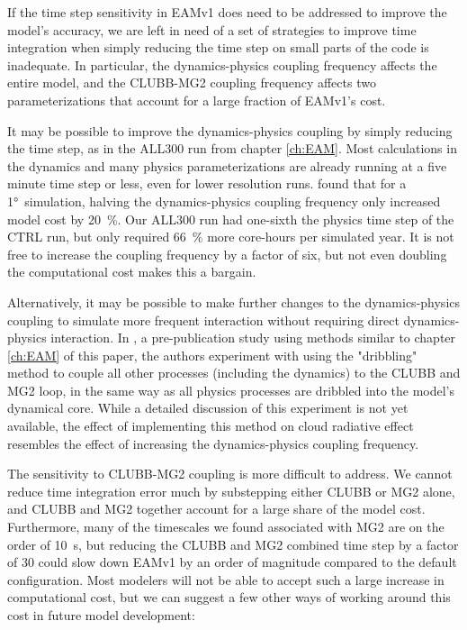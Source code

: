 \documentclass [11pt, proquest] {uwthesis}[2020/02/24]
\begin{document}
If the time step sensitivity in EAMv1 does need to be addressed to improve the model's accuracy, we are left in need of a set of strategies to improve time integration when simply reducing the time step on small parts of the code is inadequate. In particular, the dynamics-physics coupling frequency affects the entire model, and the CLUBB-MG2 coupling frequency affects two parameterizations that account for a large fraction of EAMv1's cost.

It may be possible to improve the dynamics-physics coupling by simply reducing the time step, as in the ALL300 run from chapter \ref{ch:EAM}. Most calculations in the dynamics and many physics parameterizations are already running at a five minute time step or less, even for lower resolution runs. \textcite{Donahue2020} found that for a \ang{1}~simulation, halving the dynamics-physics coupling frequency only increased model cost by \SI{20}{\percent}. Our ALL300 run had one-sixth the physics time step of the CTRL run, but only required \SI{66}{\percent} more core-hours per simulated year. It is not free to increase the coupling frequency by a factor of six, but not even doubling the computational cost makes this a bargain.

Alternatively, it may be possible to make further changes to the dynamics-physics coupling to simulate more frequent interaction without requiring direct dynamics-physics interaction. In \textcite{Wan2020}, a pre-publication study using methods similar to chapter \ref{ch:EAM} of this paper, the authors experiment with using the "dribbling" method to couple all other processes (including the dynamics) to the CLUBB and MG2 loop, in the same way as all physics processes are dribbled into the model's dynamical core. While a detailed discussion of this experiment is not yet available, the effect of implementing this method on cloud radiative effect resembles the effect of increasing the dynamics-physics coupling frequency.

The sensitivity to CLUBB-MG2 coupling is more difficult to address. We cannot reduce time integration error much by substepping either CLUBB or MG2 alone, and CLUBB and MG2 together account for a large share of the model cost. Furthermore, many of the timescales we found associated with MG2 are on the order of \SI{10}{\second}, but reducing the CLUBB and MG2 combined time step by a factor of \num{30} could slow down EAMv1 by an order of magnitude compared to the default configuration. Most modelers will not be able to accept such a large increase in computational cost, but we can suggest a few other ways of working around this cost in future model development:
\end{document}
